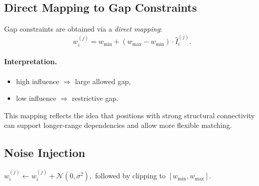 \documentclass[11pt,a4paper]{article}
\begin{document}
 \subsection{Direct Mapping to Gap Constraints}
 
 Gap constraints are obtained via a \emph{direct mapping}:
 $$
 w^{(j)}_i = w_{\min} + (w_{\max} - w_{\min}) \cdot \hat{I}^{(j)}_i.
 $$
 
 \paragraph{Interpretation.}
 \begin{itemize}
 	\item high influence $\Rightarrow$ large allowed gap,
 	\item low influence $\Rightarrow$ restrictive gap.
 \end{itemize}
 
 This mapping reflects the idea that positions with strong structural connectivity can support longer-range dependencies and allow more flexible matching.
 
 
 
 
 \subsection{Noise Injection}
 
 $
 w^{(j)}_i \leftarrow w^{(j)}_i + \mathcal{N}(0, \sigma^2),
 $
 followed by clipping to $[w_{\min}, w_{\max}]$.
 
\end{document}
